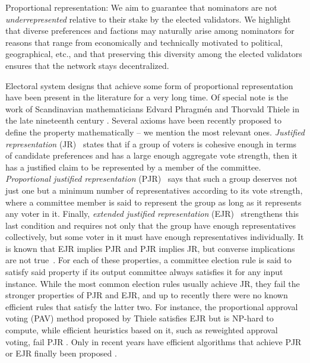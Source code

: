 Proportional representation: We aim to guarantee that nominators are not \emph{underrepresented} relative to their stake by the elected validators. 
We highlight that diverse preferences and factions may naturally arise among nominators for reasons that range from economically and technically motivated to political, geographical, etc., and that preserving this diversity among the elected validators ensures that the network stays decentralized. 

Electoral system designs that achieve some form of proportional representation have been present in the literature for a very long time. Of special note is the work of Scandinavian mathematicians Edvard Phragm\'{e}n and Thorvald Thiele in the late nineteenth century \cite{phragmen1894methode, phragmen1895proportionella, phragmen1896theorie, phragmen1899till, thiele1895om, janson2016phragmen}. 
Several axioms have been recently proposed to define the property mathematically -- we mention the most relevant ones. 
\emph{Justified representation} (JR)~\cite{aziz2017justified} states that if a group of voters is cohesive enough in terms of candidate preferences and has a large enough aggregate vote strength, then it has a justified claim to be represented by a member of the committee.
\emph{Proportional justified representation} (PJR)~\cite{sanchez2017proportional} says that such a group deserves not just one but a minimum number of representatives according to its vote strength, where a committee member is said to represent the group as long as it represents any voter in it.
Finally, \emph{extended justified representation} (EJR)~\cite{aziz2017justified} strengthens this last condition and requires not only that the group have enough representatives collectively, but some voter in it must have enough representatives individually.
It is known that EJR implies PJR and PJR implies JR, but converse implications are not true~\cite{sanchez2017proportional}. %
For each of these properties, a committee election rule is said to satisfy said property if its output committee always satisfies it for any input instance. 
While the most common election rules usually achieve JR, they fail the stronger properties of PJR and EJR, and up to recently there were no known efficient rules that satisfy the latter two. 
For instance, the proportional approval voting (PAV) method \cite{thiele1895om, janson2016phragmen} proposed by Thiele satisfies EJR but is NP-hard to compute, while efficient heuristics based on it, such as reweighted approval voting, fail PJR \cite{aziz2014computational, skowron2016finding, aziz2017justified}. 
Only in recent years have efficient algorithms that achieve PJR or EJR finally been proposed \cite{brill2017phragmen, sanchez2016maximin, aziz2018complexity, peters2019proportionality}. 

